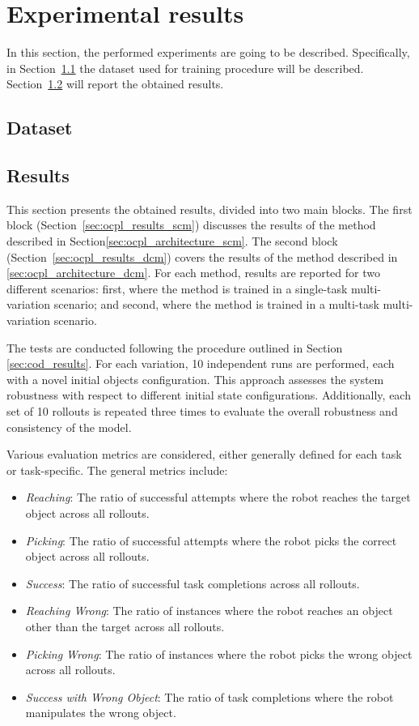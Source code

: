\section{Experimental results}
\label{sec:ocpl_experimental}

In this section, the performed experiments are going to be described. Specifically, in  
Section~\ref{sec:ocpl_dataset} the dataset used for training procedure will be described. Section~\ref{sec:ocpl_results} will report the obtained results.
\subsection{Dataset}
\label{sec:ocpl_dataset}

\subsection{Results}
\label{sec:ocpl_results}
This section presents the obtained results, divided into two main blocks. The first block (Section~\ref{sec:ocpl_results_scm}) discusses the results of the method described in Section\ref{sec:ocpl_architecture_scm}. The second block (Section~\ref{sec:ocpl_results_dcm}) covers the results of the method described in \ref{sec:ocpl_architecture_dcm}. For each method, results are reported for two different scenarios: first, where the method is trained in a single-task multi-variation scenario; and second, where the method is trained in a multi-task multi-variation scenario.

The tests are conducted following the procedure outlined in Section \ref{sec:cod_results}. For each variation, 10 independent runs are performed, each with a novel initial objects configuration. This approach assesses the system robustness with respect to different initial state configurations. Additionally, each set of 10 rollouts is repeated three times to evaluate the overall robustness and consistency of the model.

Various evaluation metrics are considered, either generally defined for each task or task-specific. The general metrics include:

\begin{itemize}
    \item \textit{Reaching}: The ratio of successful attempts where the robot reaches the target object across all rollouts.
    \item \textit{Picking}: The ratio of successful attempts where the robot picks the correct object across all rollouts.
    \item \textit{Success}: The ratio of successful task completions across all rollouts.
    \item \textit{Reaching Wrong}: The ratio of instances where the robot reaches an object other than the target across all rollouts.
    \item \textit{Picking Wrong}: The ratio of instances where the robot picks the wrong object across all rollouts.
    \item \textit{Success with Wrong Object}: The ratio of task completions where the robot manipulates the wrong object.
\end{itemize}

